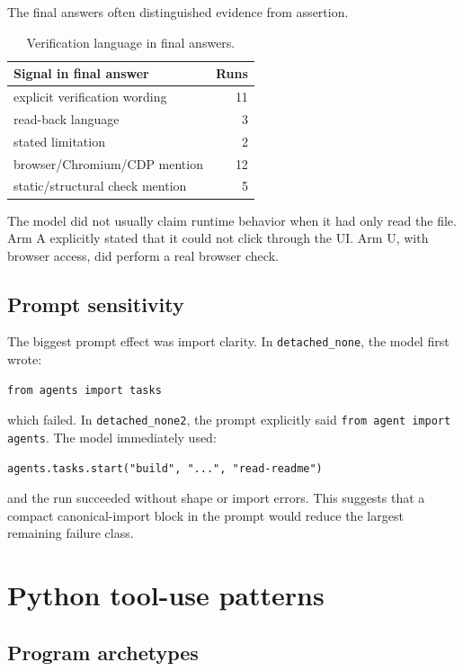 \documentclass[11pt]{article}
\newcommand{\code}[1]{\texttt{#1}}
\begin{document}
The final answers often distinguished evidence from assertion.

\begin{table}[h]
\centering
\begin{tabular}{lr}
\toprule
\textbf{Signal in final answer} & \textbf{Runs} \\
\midrule
explicit verification wording & 11 \\
read-back language & 3 \\
stated limitation & 2 \\
browser/Chromium/CDP mention & 12 \\
static/structural check mention & 5 \\
\bottomrule
\end{tabular}
\caption{Verification language in final answers.}
\end{table}

The model did not usually claim runtime behavior when it had only read the file.
Arm A explicitly stated that it could not click through the UI.  Arm U, with
browser access, did perform a real browser check.

\subsection{Prompt sensitivity}

The biggest prompt effect was import clarity.  In \code{detached\_none}, the
model first wrote:

\begin{lstlisting}[style=python]
from agents import tasks
\end{lstlisting}

which failed.  In \code{detached\_none2}, the prompt explicitly said
\code{from agent import agents}.  The model immediately used:

\begin{lstlisting}[style=python]
agents.tasks.start("build", "...", "read-readme")
\end{lstlisting}

and the run succeeded without shape or import errors.  This suggests that a
compact canonical-import block in the prompt would reduce the largest remaining
failure class.

\section{Python tool-use patterns}

\subsection{Program archetypes}
\end{document}
